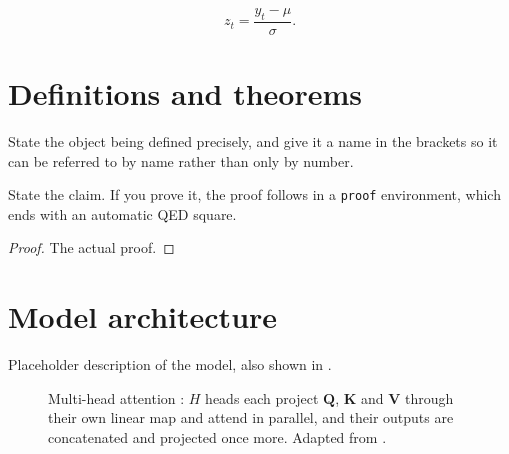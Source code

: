 \begin{equation*}
  z_t = \frac{y_t - \mu}{\sigma}.
\end{equation*}

\section{Definitions and theorems}
\label{sec:theorems}


\begin{definition}
\label{def:example}
State the object being defined precisely, and give it a name in the brackets so
it can be referred to by name rather than only by number.
\end{definition}

\begin{theorem}
\label{thm:example}
State the claim. If you prove it, the proof follows in a \texttt{proof}
environment, which ends with an automatic QED square.
\end{theorem}

\begin{proof}
The actual proof.
\end{proof}

\section{Model architecture}
\label{sec:architecture}

%

Placeholder description of the model, also shown in
.

\begin{figure}
\centering

\caption[Multi-head attention]{Multi-head attention
\parencite{vaswani2017attention}: $H$ heads each project $\bm{Q}$, $\bm{K}$ and
$\bm{V}$ through their own linear map and attend in parallel, and their outputs
are concatenated and projected once more. Adapted from
\textcite{love2024nntikz}.}
\label{fig:multihead_attention}
\end{figure}

